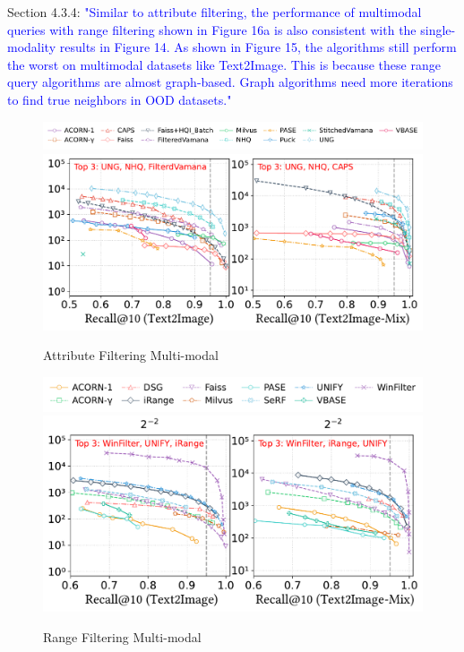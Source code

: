 \documentclass[sigconf, nonacm]{acmart}
\begin{document}
Section 4.3.4:\textcolor{blue}{
		"Similar to attribute filtering, the performance of multimodal queries with range filtering shown in Figure 16a is also consistent with the single-modality results in Figure 14. As shown in Figure 15, the algorithms still perform the worst on multimodal datasets like Text2Image. This is because these range query algorithms are almost graph-based. Graph algorithms need more iterations to find true neighbors in OOD datasets."
}

\begin{figure}[htbp]
	\centering
	\includegraphics[width=0.98\linewidth]{fig/attribute_legend.pdf}
	\includegraphics[width=\linewidth]{fig/attribute_multimodel_2.pdf}
	\caption{Attribute Filtering Multi-modal}
	\label{fig:attribute_multimodel}
\end{figure}

\begin{figure}[htbp]
	\centering
	\includegraphics[width=0.95\linewidth]{fig/range_legend.pdf}
	\includegraphics[width=\linewidth]{fig/range_multimodel_2.pdf}
	\caption{Range Filtering Multi-modal}
	\label{fig:range_multimodel}
\end{figure}
\end{document}
